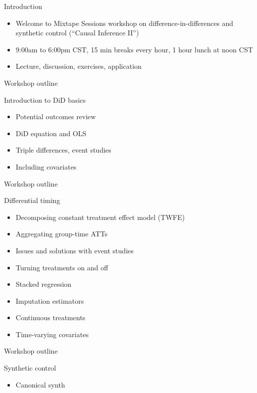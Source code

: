 \documentclass{beamer}
\begin{document}




\begin{frame}{Introduction}

\begin{itemize}
\item Welcome to Mixtape Sessions workshop on difference-in-differences and synthetic control (``Causal Inference II'')
\item 9:00am to 6:00pm CST, 15 min breaks every hour, 1 hour lunch at noon CST
\item Lecture, discussion, exercises, application
\end{itemize}

\end{frame}


\begin{frame}{Workshop outline}

Introduction to DiD basics 
	\begin{itemize}
	\item Potential outcomes review
	\item DiD equation and OLS
	\item Triple differences, event studies
	\item Including covariates
	\end{itemize}

\end{frame}


\begin{frame}{Workshop outline}

 Differential timing
	\begin{itemize}
	\item Decomposing constant treatment effect model (TWFE)
	\item Aggregating group-time ATTs
	\item Issues and solutions with event studies
	\item Turning treatments on and off
	\item Stacked regression
	\item Imputation estimators
	\item Continuous treatments
	\item Time-varying covariates
	\end{itemize}

\end{frame}

\begin{frame}{Workshop outline}

Synthetic control

\begin{itemize}
\item Canonical synth
\end{itemize}

\end{frame}
\end{document}
